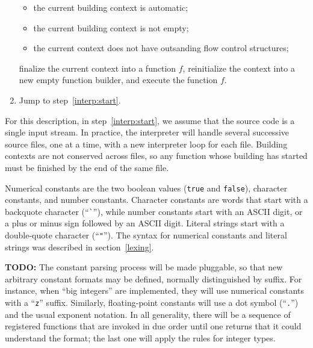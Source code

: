 \begin{enumerate}
\begin{itemize}
        \item the current building context is automatic;

        \item the current building context is not empty;

        \item the current context does not have outsanding flow
        control structures;

    \end{itemize}
    finalize the current context into a function $f$, reinitialize the
    context into a new empty function builder, and execute the function
    $f$.

    \item \label{interp:loop}Jump to step~\ref{interp:start}.

\end{enumerate}

For this description, in step~\ref{interp:start}, we assume that the
source code is a single input stream. In practice, the interpreter will
handle several successive source files, one at a time, with a new
interpreter loop for each file. Building contexts are not conserved
across files, so any function whose building has started must be
finished by the end of the same file.

Numerical constants are the two boolean values (\verb|true| and
\verb|false|), character constants, and number constants. Character
constants are words that start with a backquote character
(``\verb|`|''), while number constants start with an ASCII digit, or a
plus or minus sign followed by an ASCII digit. Literal strings start
with a double-quote character (``\verb|"|''). The syntax for numerical
constants and literal strings was described in section~\ref{lexing}.

\begin{rationale}
\textsf{\textbf{TODO:}} The constant parsing process will be made
pluggable, so that new arbitrary constant formats may be defined,
normally distinguished by suffix. For instance, when ``big integers''
are implemented, they will use numerical constants with a ``\verb|z|''
suffix. Similarly, floating-point constants will use a dot symbol
(``\verb|.|'') and the usual exponent notation. In all generality, there
will be a sequence of registered functions that are invoked in due order
until one returns that it could understand the format; the last one will
apply the rules for integer types.
\end{rationale}

